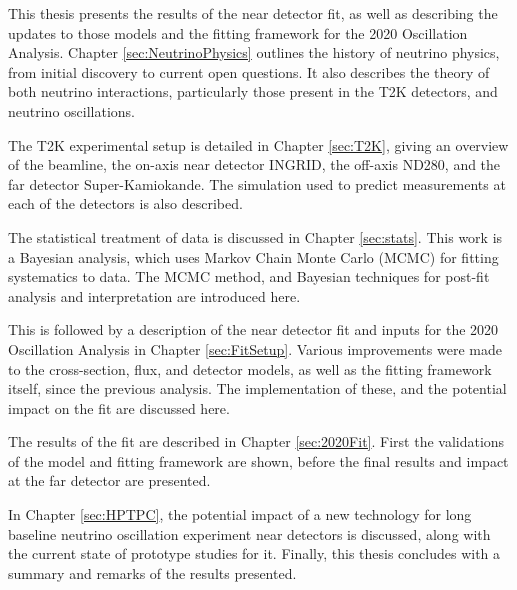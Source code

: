 This thesis presents the results of the near detector fit, as well as describing the updates to those models and the fitting framework for the 2020 Oscillation Analysis. Chapter \ref{sec:NeutrinoPhysics} outlines the history of neutrino physics, from initial discovery to current open questions. It also describes the theory of both neutrino interactions, particularly those present in the T2K detectors, and neutrino oscillations.

The T2K experimental setup is detailed in Chapter \ref{sec:T2K}, giving an overview of the beamline, the on-axis near detector INGRID, the off-axis ND280, and the far detector Super-Kamiokande. The simulation used to predict measurements at each of the detectors is also described.

The statistical treatment of data is discussed in Chapter \ref{sec:stats}. This work is a Bayesian analysis, which uses Markov Chain Monte Carlo (MCMC) for fitting systematics to data. The MCMC method, and Bayesian techniques for post-fit analysis and interpretation are introduced here.

This is followed by a description of the near detector fit and inputs for the 2020 Oscillation Analysis in Chapter \ref{sec:FitSetup}. Various improvements were made to the cross-section, flux, and detector models, as well as the fitting framework itself, since the previous analysis. The implementation of these, and the potential impact on the fit are discussed here.

The results of the fit are described in Chapter \ref{sec:2020Fit}. First the validations of the model and fitting framework are shown, before the final results and impact at the far detector are presented.

In Chapter \ref{sec:HPTPC}, the potential impact of a new technology for long baseline neutrino oscillation experiment near detectors is discussed, along with the current state of prototype studies for it. Finally, this thesis concludes with a summary and remarks of the results presented.

\newpage